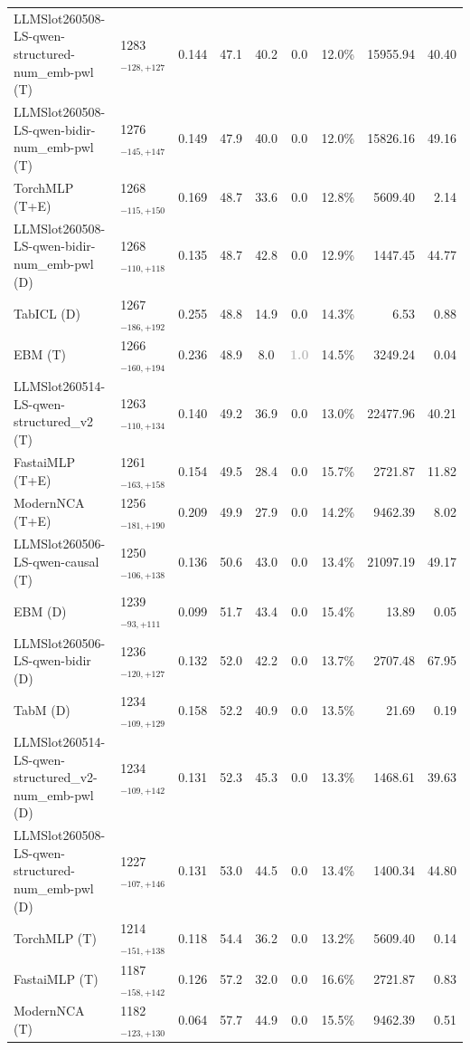 \begin{tabular}{llcccccrr}
LLMSlot260508-LS-qwen-structured-num_emb-pwl (T) & 1283${}_{-128,+127}$ & 0.144 & 47.1 & 40.2 & 0.0 & 12.0\% & 15955.94 & 40.40 \\
LLMSlot260508-LS-qwen-bidir-num_emb-pwl (T) & 1276${}_{-145,+147}$ & 0.149 & 47.9 & 40.0 & 0.0 & 12.0\% & 15826.16 & 49.16 \\
TorchMLP (T+E) & 1268${}_{-115,+150}$ & 0.169 & 48.7 & 33.6 & 0.0 & 12.8\% & 5609.40 & 2.14 \\
LLMSlot260508-LS-qwen-bidir-num_emb-pwl (D) & 1268${}_{-110,+118}$ & 0.135 & 48.7 & 42.8 & 0.0 & 12.9\% & 1447.45 & 44.77 \\
TabICL (D) & 1267${}_{-186,+192}$ & 0.255 & 48.8 & 14.9 & 0.0 & 14.3\% & 6.53 & 0.88 \\
EBM (T) & 1266${}_{-160,+194}$ & 0.236 & 48.9 & 8.0 & \textcolor{silver}{\textbf{1.0}} & 14.5\% & 3249.24 & 0.04 \\
LLMSlot260514-LS-qwen-structured_v2 (T) & 1263${}_{-110,+134}$ & 0.140 & 49.2 & 36.9 & 0.0 & 13.0\% & 22477.96 & 40.21 \\
FastaiMLP (T+E) & 1261${}_{-163,+158}$ & 0.154 & 49.5 & 28.4 & 0.0 & 15.7\% & 2721.87 & 11.82 \\
ModernNCA (T+E) & 1256${}_{-181,+190}$ & 0.209 & 49.9 & 27.9 & 0.0 & 14.2\% & 9462.39 & 8.02 \\
LLMSlot260506-LS-qwen-causal (T) & 1250${}_{-106,+138}$ & 0.136 & 50.6 & 43.0 & 0.0 & 13.4\% & 21097.19 & 49.17 \\
EBM (D) & 1239${}_{-93,+111}$ & 0.099 & 51.7 & 43.4 & 0.0 & 15.4\% & 13.89 & 0.05 \\
LLMSlot260506-LS-qwen-bidir (D) & 1236${}_{-120,+127}$ & 0.132 & 52.0 & 42.2 & 0.0 & 13.7\% & 2707.48 & 67.95 \\
TabM (D) & 1234${}_{-109,+129}$ & 0.158 & 52.2 & 40.9 & 0.0 & 13.5\% & 21.69 & 0.19 \\
LLMSlot260514-LS-qwen-structured_v2-num_emb-pwl (D) & 1234${}_{-109,+142}$ & 0.131 & 52.3 & 45.3 & 0.0 & 13.3\% & 1468.61 & 39.63 \\
LLMSlot260508-LS-qwen-structured-num_emb-pwl (D) & 1227${}_{-107,+146}$ & 0.131 & 53.0 & 44.5 & 0.0 & 13.4\% & 1400.34 & 44.80 \\
TorchMLP (T) & 1214${}_{-151,+138}$ & 0.118 & 54.4 & 36.2 & 0.0 & 13.2\% & 5609.40 & 0.14 \\
FastaiMLP (T) & 1187${}_{-158,+142}$ & 0.126 & 57.2 & 32.0 & 0.0 & 16.6\% & 2721.87 & 0.83 \\
ModernNCA (T) & 1182${}_{-123,+130}$ & 0.064 & 57.7 & 44.9 & 0.0 & 15.5\% & 9462.39 & 0.51 \\

\end{tabular}
